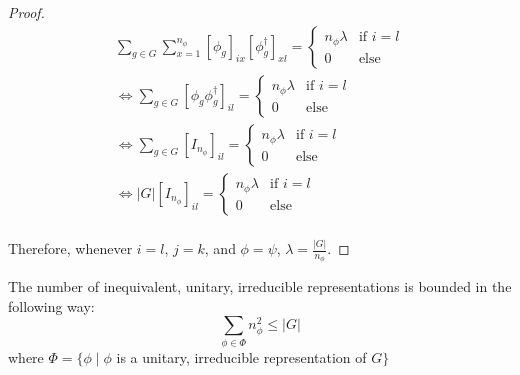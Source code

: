\begin{proof}
$$\begin{aligned}
			\sum_{g\in G} \sum_{x=1}^{n_\phi}\left[\phi_g\right]_{ix}\left[\phi^\dag_g\right]_{xl} = \begin{cases}
																			n_\phi\lambda &\text{if } i = l\\
																			0 & \text{else}
																			\end{cases}\\
\Leftrightarrow
			\sum_{g\in G} \left[\phi_g\phi^\dag_g\right]_{il} = \begin{cases}
																			n_\phi\lambda &\text{if } i = l\\
																			0 & \text{else}
																			\end{cases}\\
\Leftrightarrow
			\sum_{g\in G} \left[I_{n_\phi}\right]_{il} = \begin{cases}
																			n_\phi\lambda &\text{if } i = l\\
																			0 & \text{else}
																			\end{cases}\\
\Leftrightarrow
			|G|\left[I_{n_\phi}\right]_{il} = \begin{cases}
																			n_\phi\lambda &\text{if } i = l\\
																			0 & \text{else}
																			\end{cases}\\
\end{aligned}$$ 

Therefore, whenever $i=l$, $j=k$, and $\phi=\psi$, $\lambda = \frac{|G|}{n_\phi}$. \end{proof} 



\begin{corrolary}
	The number of inequivalent, unitary, irreducible representations is bounded in the following way:
$$\sum_{\phi \in \Phi}n^2_\phi \leq |G|$$
where $\Phi = \{\phi \mid \phi$ is a unitary, irreducible representation of $G\}$
\end{corrolary}


